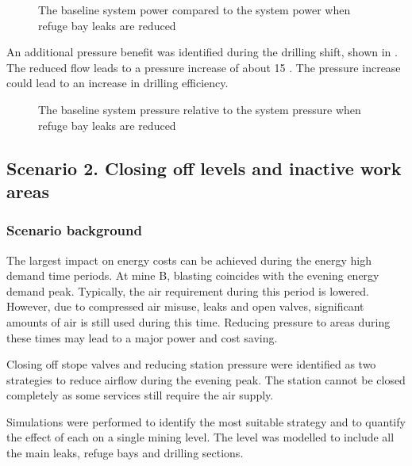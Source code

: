 	\par
	\begin{figure}[h!]
		\centering
		
		\caption{The baseline system power compared to the system power when refuge bay leaks are reduced}
		\label{fig: RefugeBay Power.}
	\end{figure} 
	An additional pressure benefit was identified during the drilling shift, shown in . The reduced flow leads to a pressure increase of about 15 . The pressure increase could lead to an increase in drilling efficiency.
	\begin{figure}[h!]
		\centering
		
		\caption{The baseline system pressure relative to the system pressure when refuge bay leaks are reduced}
		\label{fig: RefugeBay Pressures.}
	\end{figure} 
	\subsection{Scenario 2. Closing off levels and inactive work areas}
	\subsubsection{Scenario background}
	The largest impact on energy costs can be achieved during the energy high demand time periods. At mine B, blasting coincides with the evening energy demand peak. Typically, the air requirement during this period is lowered. However, due to compressed air misuse, leaks and open valves, significant amounts of air is still used during this time. Reducing pressure to areas during these times may lead to a major power and cost saving. 
	\par 
	Closing off stope valves and reducing station pressure were identified as two strategies to reduce airflow during the evening peak. The station cannot be closed completely as some services still require the air supply. 
	\par 
	Simulations were performed to identify the most suitable strategy and to quantify the effect of each on a single mining level. The level was modelled to include all the main leaks, refuge bays and drilling sections.  

